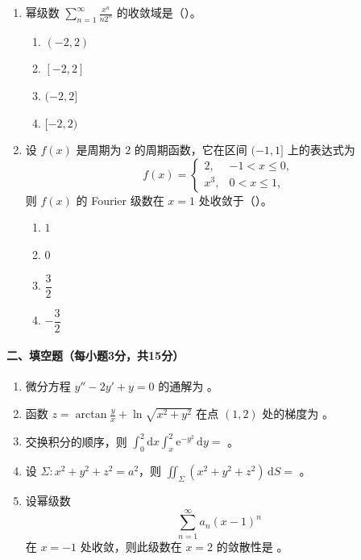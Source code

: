 \begin{enumerate}
  \item 幂级数 \(\displaystyle \sum_{n=1}^{\infty}\frac{x^n}{n2^n}\) 的收敛域是（\quad）。
  \begin{enumerate}
    \item[A.] \((-2,2)\)
    \item[B.] \([-2,2]\)
    \item[C.] \((-2,2]\)
    \item[D.] \([-2,2)\)
  \end{enumerate}

  \item 设 \(f(x)\) 是周期为 \(2\) 的周期函数，它在区间 \((-1,1]\) 上的表达式为
  \[
    f(x)=
    \begin{cases}
      2, & -1<x\le 0,\\
      x^3, & 0<x\le 1,
    \end{cases}
  \]
  则 \(f(x)\) 的 Fourier 级数在 \(x=1\) 处收敛于（\quad）。
  \begin{enumerate}
    \item[A.] \(1\)
    \item[B.] \(0\)
    \item[C.] \(\dfrac32\)
    \item[D.] \(-\dfrac32\)
  \end{enumerate}
\end{enumerate}

\paragraph*{二、填空题（每小题3分，共15分）}
\begin{enumerate}
  \item 微分方程 \(y''-2y'+y=0\) 的通解为 \underline{\hspace{5cm}}。
  \item 函数 \(\displaystyle z=\arctan\frac{y}{x}+\ln\sqrt{x^2+y^2}\) 在点 \((1,2)\) 处的梯度为 \underline{\hspace{5cm}}。
  \item 交换积分的顺序，则 \(\displaystyle \int_0^2\mathrm{d}x\int_x^2 \mathrm{e}^{-y^2}\,\mathrm{d}y=\) \underline{\hspace{5cm}}。
  \item 设 \(\Sigma:x^2+y^2+z^2=a^2\)，则
  \(\displaystyle \iint_\Sigma (x^2+y^2+z^2)\,\mathrm{d}S=\) \underline{\hspace{5cm}}。
  \item 设幂级数
  \[
    \sum_{n=1}^{\infty}a_n(x-1)^n
  \]
  在 \(x=-1\) 处收敛，则此级数在 \(x=2\) 的敛散性是 \underline{\hspace{5cm}}。
\end{enumerate}

